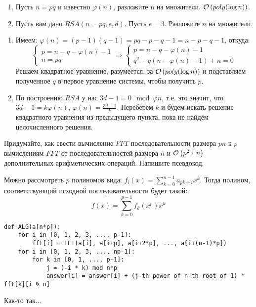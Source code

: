 \begin{task}[2]
\begin{enumerate}[label=(\alph*)]
	\item Пусть $n = pq$ и известно $\varphi{(n)}$, разложите n на множители. $\mathcal{O}\left(poly(\log n)\right)$.
	\item Пусть вам дано $RSA(n = pq, e, d)$. Пусть $e = 3$. Разложите $n$ на множители.
\end{enumerate}
\end{task}
\begin{solution}

\begin{enumerate}[label=(\alph*)]
	\item Имеем: $\varphi(n) = (p-1)(q-1) = pq - p - q - 1 = n - p - q - 1$, откуда:
	\[
		\begin{cases}
			p = n - q - \varphi(n) - 1 \\
			n = pq
		\end{cases}
		\Rightarrow
		\begin{cases}
			p = n - q - \varphi(n) - 1 \\
			q^2 - q(n - \varphi(n) - 1) + n = 0
		\end{cases}
	\]
	Решаем квадратное уравнение, разумеется, за $\mathcal{O}\left(poly(\log n)\right)$ и подставляем полученное $q$ в первое уравнение системы, чтобы получить $p$. \xqed

	\item По построению $RSA$ у нас $3d - 1 = 0 \mod{\varphi{n}}$, т.е. это значит, что $3d-1 = k\varphi{(n)}$, $\varphi{(n)} = \frac{3d-1}{k}$. Переберём $k$ и будем искать решение квадратного уравнения из предыдущего пункта, пока не найдём целочисленного решения. \xqed
\end{enumerate}
\end{solution}

\begin{task}[4]
Придумайте, как свести вычисление $FFT$ последовательности размера $pn$ к $p$ вычислениям $FFT$ от
последовательностей размера $n$ и $\mathcal{O}\left(p^2*n\right)$ дополнительных арифметических операций. Напишите
псевдокод.
\end{task}
\begin{solution}
Можно рассмотреть $p$ полиномов вида: $f_i(x) = \sum_{k=0}^{n-1}{a_{pk + i}x^k}$. Тогда полином, соответствующий исходной последовательности будет такой:
\[
	f(x) = \sum_{k = 0}^{p-1}{f_k(x^p)x^k}
\]
\end{solution}

\begin{lstlisting}
def ALG(a[n*p]):
	for i in [0, 1, 2, 3, ..., p-1]:
		fft[i] = FFT(a[i], a[i+p], a[i+2*p], ..., a[i+(n-1)*p])
	for i in [0, 1, 2, 3, ..., np-1]:
		for k in [0, 1, ..., p-1]:
			j = (-i * k) mod n*p
			answer[i] = answer[i] + (j-th power of n-th root of 1) * fft[k][i % n]
\end{lstlisting}
Как-то так...\xqed

